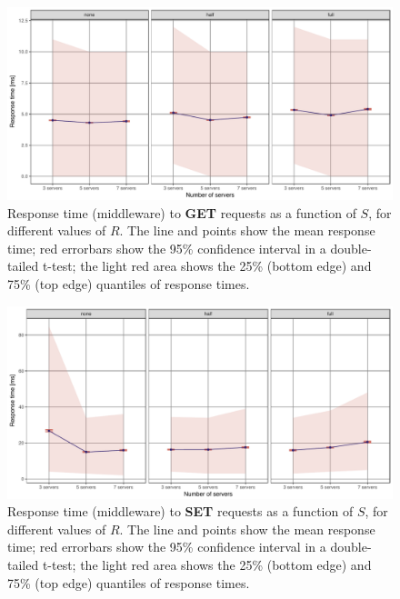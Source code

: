 \documentclass[11pt]{article}
\begin{document}
\begin{figure}[h]
\centering
\includegraphics[width=\textwidth]{../results/replication/graphs/response_time_vs_servers_get.pdf}
\caption{Response time (middleware) to \textbf{GET} requests as a function of $S$, for different values of $R$. The line and points show the mean response time; red errorbars show the 95\% confidence interval in a double-tailed t-test; the light red area shows the 25\% (bottom edge) and 75\% (top edge) quantiles of response times.}
\label{fig:exp2:res:servers:get}
\end{figure}
 

\begin{figure}[h]
\centering
\includegraphics[width=\textwidth]{../results/replication/graphs/response_time_vs_servers_set.pdf}
\caption{Response time (middleware) to \textbf{SET} requests as a function of $S$, for different values of $R$. The line and points show the mean response time; red errorbars show the 95\% confidence interval in a double-tailed t-test; the light red area shows the 25\% (bottom edge) and 75\% (top edge) quantiles of response times.}
\label{fig:exp2:res:servers:set}
\end{figure}
\end{document}
